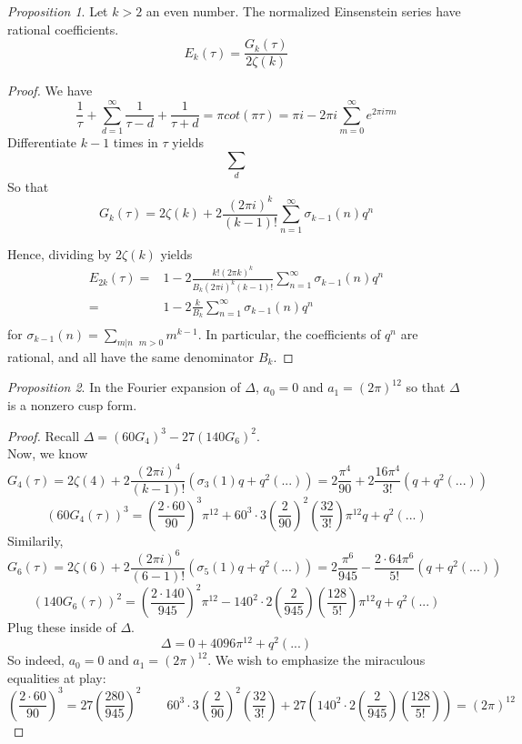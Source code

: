 \documentclass[11pt]{article}
\theoremstyle{plain}
\theoremstyle{definition}
\theoremstyle{example}
\theoremstyle{remark}
\theoremstyle{lemma}
\theoremstyle{proposition}
\newtheorem{proposition}{Proposition}[section]
\theoremstyle{Problem}
\theoremstyle{Solution}
\theoremstyle{theorem}
\theoremstyle{corollary}
\begin{document}
\begin{proposition}
Let $k>2$ an even number. The normalized Einsenstein series have rational coefficients.
$$E_k(\tau) = \frac{G_k(\tau)}{2\zeta(k)}$$
\end{proposition}

\begin{proof}
We have $$\frac{1}{\tau}+\sum_{d=1}^\infty\frac{1}{\tau-d}+\frac{1}{\tau+d} = \pi  cot(\pi\tau) = \pi i - 2\pi i \sum_{m=0}^\infty e^{2\pi i \tau m}$$
Differentiate $k-1$ times in $\tau$ yields
$$\sum_{d}$$ 
So that $$G_k(\tau) = 2\zeta(k) + 2\frac{(2\pi i)^k}{(k-1)!}\sum_{n=1}^\infty \sigma_{k-1}(n)q^n$$

Hence, dividing by $2\zeta(k)$ yields 
\begin{eqnarray*}
E_{2k}(\tau) =& 1 - 2\frac{k!(2\pi k)^k}{B_k(2\pi i)^k(k-1)!}\sum_{n=1}^\infty \sigma_{k-1}(n)q^n\\
=& 1 - 2\frac{k}{B_k}\sum_{n=1}^\infty \sigma_{k-1}(n)q^n\\
\end{eqnarray*}
for $\sigma_{k-1}(n) = \sum_{m|n \text{  } m>0} m^{k-1}$. In particular, the coefficients of $q^n$ are rational, and all have the same denominator $B_k$. 
\end{proof}

\begin{proposition}
In the Fourier expansion of $\Delta$, $a_0=0$ and $a_1=(2\pi)^{12}$ so that $\Delta$ is a nonzero cusp form.
\end{proposition}
\begin{proof}
Recall $\Delta = (60G_4)^3 - 27(140G_6)^2$.\\
Now, we know $$G_4(\tau) = 2\zeta(4) + 2\frac{(2\pi i)^4}{(k-1)!}(\sigma_3(1)q + q^2(...)) = 2\frac{\pi^4}{90} + 2\frac{16\pi^4}{3!}(q+q^2(...))$$
$$(60G_4(\tau))^3 = \left(\frac{2\cdot60}{90}\right)^3 \pi^{12} + 60^3\cdot3\left(\frac{2}{90}\right)^2\left(\frac{32}{3!}\right)\pi^{12}q+q^2(...)$$
Similarily, $$G_6(\tau) = 2\zeta(6)+ 2\frac{(2\pi i)^6}{(6-1)!}(\sigma_5(1)q+q^2(...)) = 2\frac{\pi^6}{945} - \frac{2\cdot64\pi^6}{5!}(q+q^2(...))$$
 $$(140G_6(\tau))^2 = \left(\frac{2\cdot 140}{945}\right)^2\pi^{12} - 140^2\cdot2\left(\frac{2}{945}\right)\left(\frac{128}{5!}\right)\pi^{12}q+q^2(...)$$
Plug these inside of $\Delta$. 
$$\Delta = 0 + 4096\pi^12 + q^2(...)$$
So indeed, $a_0=0$ and $a_1=(2\pi)^{12}$. We wish to emphasize the miraculous equalities at play:
$$\left(\frac{2\cdot60}{90}\right)^3 = 27\left(\frac{280}{945}\right)^2 \qquad 60^3\cdot3\left(\frac{2}{90}\right)^2\left(\frac{32}{3!}\right) + 27\left(140^2\cdot2\left(\frac{2}{945}\right)\left(\frac{128}{5!}\right)\right) = (2\pi)^{12}$$
\end{proof}
\end{document}
